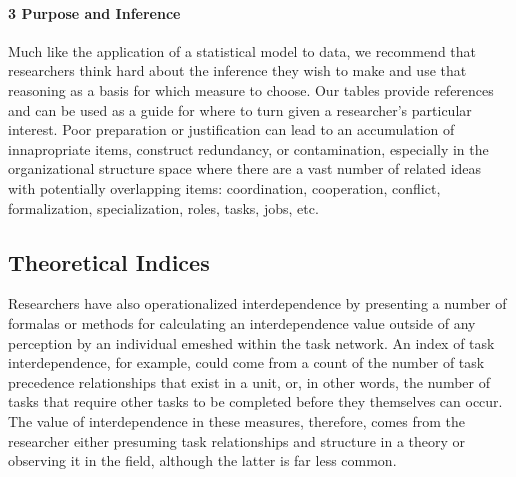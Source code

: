 \documentclass[english,,man]{apa6}
\let\oldparagraph\paragraph
\renewcommand{\paragraph}[1]{\oldparagraph{#1}\mbox{}}
\theoremstyle{definition}
\theoremstyle{definition}
\theoremstyle{definition}
\theoremstyle{remark}
\begin{document}
\hypertarget{purpose-and-inference}{%
\paragraph{3 Purpose and Inference}\label{purpose-and-inference}}

Much like the application of a statistical model to data, we recommend
that researchers think hard about the inference they wish to make and
use that reasoning as a basis for which measure to choose. Our tables
provide references and can be used as a guide for where to turn given a
researcher's particular interest. Poor preparation or justification can
lead to an accumulation of innapropriate items, construct redundancy, or
contamination, especially in the organizational structure space where
there are a vast number of related ideas with potentially overlapping
items: coordination, cooperation, conflict, formalization,
specialization, roles, tasks, jobs, etc.

\hypertarget{theoretical-indices}{%
\subsection{Theoretical Indices}\label{theoretical-indices}}

Researchers have also operationalized interdependence by presenting a
number of formalas or methods for calculating an interdependence value
outside of any perception by an individual emeshed within the task
network. An index of task interdependence, for example, could come from
a count of the number of task precedence relationships that exist in a
unit, or, in other words, the number of tasks that require other tasks
to be completed before they themselves can occur. The value of
interdependence in these measures, therefore, comes from the researcher
either presuming task relationships and structure in a theory or
observing it in the field, although the latter is far less common.
\end{document}
